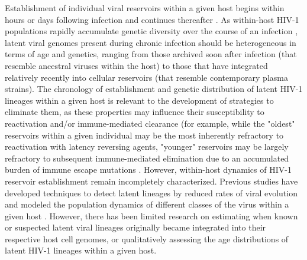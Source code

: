 \documentclass[12pt]{article}
\begin{document}
Establishment of individual viral reservoirs within a given host  begins within hours or days following infection and continues thereafter \citep{Whitney14,Leford14}.
As within-host HIV-1 populations rapidly accumulate genetic diversity over the course of an infection \citep{Alizon13,Rambaut04,Shankarappa99}, latent viral genomes present during chronic infection should be heterogeneous in terms of age and genetics, ranging from those archived soon after infection (that resemble ancestral viruses within the host) to those that have integrated relatively recently into cellular reservoirs (that resemble contemporary plasma strains).
The chronology of establishment and genetic distribution of latent HIV-1 lineages within a given host is relevant to the development of strategies to eliminate them, as these properties may influence their susceptibility to reactivation and/or immune-mediated clearance (for example, while the "oldest" reservoirs within a given individual may be the most inherently refractory to reactivation with latency reversing agents, "younger" reservoirs may be largely refractory to subsequent immune-mediated elimination due to an accumulated burden of immune escape mutations \citep{Deng15}.
However, within-host dynamics of HIV-1 reservoir establishment remain incompletely characterized.
Previous studies have developed techniques to detect latent lineages by reduced rates of viral evolution \citep{Immonen14} and modeled the population dynamics of different classes of the virus within a given host \citep{Althaus14}.
However, there has been limited research on estimating when known or suspected latent viral lineages originally became integrated into their respective host cell genomes, or qualitatively assessing the age distributions of latent HIV-1 lineages within a given host.  
\end{document}
